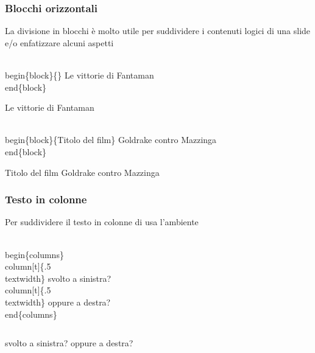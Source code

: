\documentclass[svgnames,%
	ucs,%
	pdftex]{guitbeamer}
\begin{document}
\begin{frame}
  \frametitle{Blocchi orizzontali}
	La divisione in blocchi \`e molto utile per suddividere i contenuti logici di una slide e/o enfatizzare alcuni aspetti
	\begin{LaTeXcode}
		\alert{\\begin\{}block\alert{\}\{\}}\n
			\hspace*{5ex} Le vittorie di Fantaman\n
		\alert{\\end\{}block\alert{\}}
	\end{LaTeXcode}
	\begin{block}{}
		Le vittorie di Fantaman
	\end{block}
	\begin{LaTeXcode}
		\\begin\{block\}\{\alert{Titolo del film}\}\n
			\hspace*{5ex} Goldrake contro Mazzinga\n
		\\end\{block\}
	\end{LaTeXcode}
	\begin{block}{Titolo del film}
		Goldrake contro Mazzinga
	\end{block}
\end{frame}
\begin{frame}
  \frametitle{Testo in colonne}
	Per suddividere il testo in colonne di usa l'ambiente \LCmd[]{columns}
	\begin{LaTeXcode}
		\\begin\{columns\}\n
	  \onslide<2->
		\hspace*{5ex} \alert{\\column[t]\{.5\\textwidth\}}\n
	  \onslide<3->
		\hspace*{10ex} svolto a sinistra?\n 
	  \onslide<2->
		\hspace*{5ex} \alert{\\column[t]\{.5\\textwidth\}}\n
	  \onslide<3->
		\hspace*{10ex} oppure a destra?\n 
	  \onslide<1->
		\\end\{columns\}	
	\end{LaTeXcode}
  \bigskip
	\begin{columns}
		svolto a sinistra?
		oppure a destra?
	\end{columns}
\end{frame}
\end{document}
